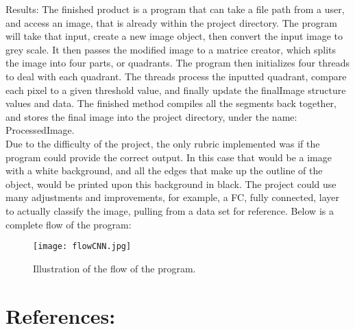 \documentclass{article}
\begin{document}
Results: The finished product is a program that can take a file path from a user, and access an image, that is already
within the project directory. The program will take that input, create a new image object, then convert the input
image to grey scale. It then passes the modified image to a matrice creator, which splits the image
into four parts, or quadrants. The program then initializes four threads to deal with each quadrant.
The threads process the inputted quadrant, compare each pixel to a given threshold value, and finally update the
finalImage structure values and data. The finished method compiles all the segments back together, and stores the final image
into the project directory, under the name: ProcessedImage.\vspace{.5 cm}\\
Due to the difficulty of the project, the only rubric implemented was if the program could provide the correct
 output. In this case that would be a image with a white background, and all the edges that make up the outline
 of the object, would be printed upon this background in black. The project could use many adjustments and improvements,
  for example, a FC, fully connected, layer to actually classify the image, pulling from a data set for reference.
  Below is a complete flow of the program:\vspace{.5 cm}\\
  \begin{figure}[htbp]
    \centering
    \texttt{[image: flowCNN.jpg]}
    \caption{Illustration of the flow of the program.}
    \label{fig: Flow Diagram}
\end{figure}

\clearpage
\section{References:}



\end{document}
